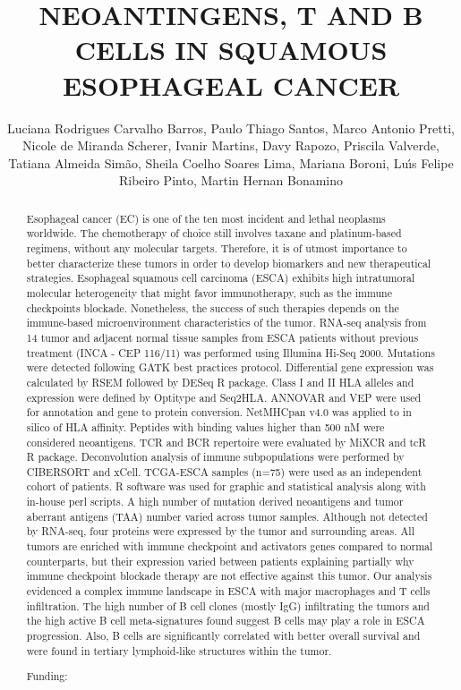 \documentclass[twoside]{article}
\title{\vspace{-15mm}\fontsize{24pt}{10pt}\selectfont\textbf{ NEOANTINGENS,  T AND B CELLS IN SQUAMOUS ESOPHAGEAL CANCER }} %
\author{ Luciana Rodrigues Carvalho Barros, Paulo Thiago Santos, Marco Antonio Pretti, Nicole de Miranda Scherer, Ivanir Martins, Davy Rapozo, Priscila Valverde, Tatiana Almeida Sim\~ao, Sheila Coelho Soares Lima, Mariana Boroni, Lu\'{\i}s Felipe Ribeiro Pinto, Martin Hernan Bonamino }
\affil{ Instituto Nacional de C\^ancer }
\date{}
\begin{document}
  
  
  \maketitle %
  
  
  \thispagestyle{fancy} %
  
  
  \begin{abstract}
  Esophageal cancer (EC) is one of the ten most incident and lethal neoplasms worldwide. The chemotherapy of choice still involves taxane and platinum-based regimens,  without any molecular targets. Therefore,  it is of utmost importance to better characterize these tumors in order to develop biomarkers and new therapeutical strategies. Esophageal squamous cell carcinoma (ESCA) exhibits high intratumoral molecular heterogeneity that might favor immunotherapy,  such as the immune checkpoints blockade. Nonetheless,  the success of such therapies depends on the immune-based microenvironment characteristics of the tumor. RNA-seq analysis from 14 tumor and adjacent normal tissue samples from ESCA patients without previous treatment (INCA - CEP 116/11) was performed using Illumina Hi-Seq 2000. Mutations were detected following GATK best practices protocol. Differential gene expression was calculated by RSEM followed by DESeq R package. Class I and II HLA alleles and expression were defined by Optitype and Seq2HLA. ANNOVAR and VEP were used for annotation and gene to protein conversion. NetMHCpan v4.0 was applied to in silico of HLA affinity. Peptides with binding values higher than 500 nM were considered neoantigens. TCR and BCR repertoire were evaluated by MiXCR and tcR R package. Deconvolution analysis of immune subpopulations were performed by CIBERSORT and xCell. TCGA-ESCA samples (n=75) were used as an independent cohort of patients. R software was used for graphic and statistical analysis along with in-house perl scripts. A high number of mutation derived neoantigens and tumor aberrant antigens (TAA) number varied across tumor samples. Although not detected by RNA-seq,  four proteins were expressed by the tumor and surrounding areas. All tumors are enriched with immune checkpoint and activators genes compared to normal counterparts,  but their expression varied between patients explaining partially why immune checkpoint blockade therapy are not effective against this tumor. Our analysis evidenced a complex immune landscape in ESCA with major macrophages and T cells infiltration. The high number of B cell clones (mostly IgG) infiltrating the tumors and the high active B cell meta-signatures found suggest B cells may play a role in ESCA  progression. Also,  B cells are significantly correlated with better overall survival and were found in tertiary lymphoid-like structures within the tumor.
  
  Funding:  \\ 
  \end{abstract}
  
\end{document}
